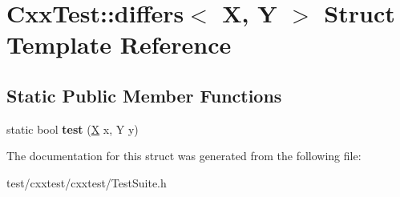 \hypertarget{structCxxTest_1_1differs}{\section{Cxx\-Test\-:\-:differs$<$ X, Y $>$ Struct Template Reference}
\label{structCxxTest_1_1differs}
}
\subsection*{Static Public Member Functions}
\begin{DoxyCompactItemize}
\item 
\hypertarget{structCxxTest_1_1differs_a3ddb7c274892fd7232ab077c100dd09a}{static bool {\bfseries test} (\hyperlink{classX}{X} x, Y y)}\label{structCxxTest_1_1differs_a3ddb7c274892fd7232ab077c100dd09a}

\end{DoxyCompactItemize}


The documentation for this struct was generated from the following file\-:\begin{DoxyCompactItemize}
\item 
test/cxxtest/cxxtest/Test\-Suite.\-h\end{DoxyCompactItemize}
